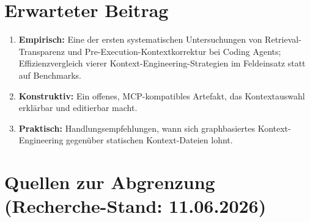 \documentclass[12pt,a4paper]{scrartcl}
\begin{document}
\section{Erwarteter Beitrag}

\begin{enumerate}[leftmargin=1.6em]
  \item \textbf{Empirisch:} Eine der ersten systematischen Untersuchungen von
    Retrieval-Transparenz und Pre-Execution-Kontextkorrektur bei Coding Agents;
    Effizienzvergleich vierer
    Kontext-Engineering-Strategien im Feldeinsatz statt auf Benchmarks.
  \item \textbf{Konstruktiv:} Ein offenes, MCP-kompatibles Artefakt, das Kontextauswahl
    erklärbar und editierbar macht.
  \item \textbf{Praktisch:} Handlungsempfehlungen, wann sich graphbasiertes
    Kontext-Engineering gegenüber statischen Kontext-Dateien lohnt.
\end{enumerate}

\section*{Quellen zur Abgrenzung (Recherche-Stand: 11.06.2026)}
\end{document}
